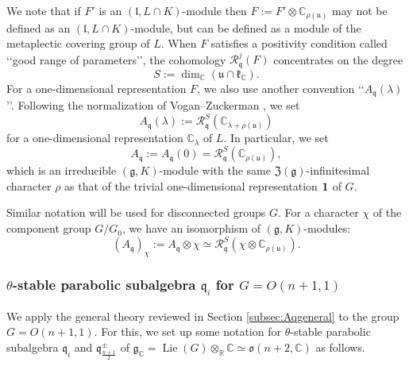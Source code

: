 We note that if $F'$ is an $({\mathfrak{l}}, L \cap K)$-module
 then $F:=F' \otimes {\mathbb{C}}_{\rho({\mathfrak{u}})}$
 may not be defined 
 as an $({\mathfrak{l}}, L \cap K)$-module, 
 but can be defined as a module of the metaplectic covering group of $L$.  
When $F$ satisfies a positivity condition called 
 \lq\lq{good range of parameters}\rq\rq, 
 the cohomology ${\mathcal{R}}_{\mathfrak{q}}^j(F)$ concentrates
 on the degree 
\[
   S:=\dim_{\mathbb{C}}({\mathfrak{u}} \cap {\mathfrak{k}}_{\mathbb{C}}).  
\]
For a one-dimensional representation $F$, 
 we also use another convention
 \lq\lq{$A_{\mathfrak{q}}(\lambda)$}\rq\rq.  
Following the normalization of Vogan--Zuckerman \cite{VZ}, 
 we set
\[
  A_{\mathfrak{q}}(\lambda):={\mathcal{R}}_{\mathfrak{q}}^S({\mathbb{C}}
_{\lambda+\rho({\mathfrak{u}})})
\]
for a one-dimensional representation ${\mathbb{C}}_{\lambda}$
 of $L$.  
In particular,
 we set
\[
   A_{\mathfrak{q}}:=A_{\mathfrak{q}}(0)
                   ={\mathcal{R}}_{\mathfrak{q}}^S({\mathbb{C}}_{\rho({\mathfrak{u}})}), 
\]
 which is an irreducible $({\mathfrak{g}},K)$-module
 with the same ${\mathfrak{Z}}({\mathfrak{g}})$-infinitesimal character $\rho$
 as that of the trivial one-dimensional representation ${\bf{1}}$ of $G$.  



Similar notation will be used for disconnected groups $G$.  
For a character $\chi$ of the component group $G/G_0$, 
 we have an isomorphism of $({\mathfrak{g}},K)$-modules:
\[
   (A_{\mathfrak{q}})_{\chi}:=A_{\mathfrak{q}} \otimes \chi
   \simeq {\mathcal{R}}_{\mathfrak{q}}^S(\chi\otimes {\mathbb{C}}_{\rho({\mathfrak{u}})}).  
\]



\subsubsection{$\theta$-stable parabolic subalgebra ${\mathfrak{q}}_i$
 for $G=O(n+1,1)$}
\label{subsec:qi}
We apply the general theory
 reviewed in Section \ref{subsec:Aqgeneral}
 to the group $G=O(n+1,1)$.  
For this, 
we set up some notation 
 for $\theta$-stable parabolic subalgebra ${\mathfrak{q}}_i$
 and ${\mathfrak{q}}_{\frac{n+1}{2}}^{\pm}$
 of ${\mathfrak{g}}_{\mathbb{C}} = {\operatorname{Lie}}(G) \otimes_{\mathbb{R}} {\mathbb{C}}
\simeq {\mathfrak{o}}(n+2,{\mathbb{C}})$
 as follows.  



